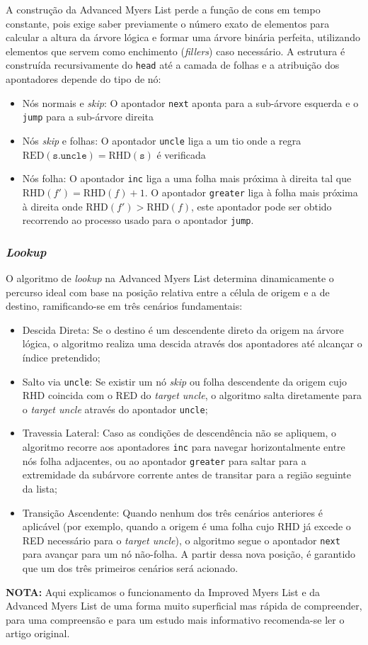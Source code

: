 A construção da Advanced Myers List perde a função de cons em tempo constante, pois exige saber previamente o número exato de elementos para calcular a altura da árvore lógica e formar uma árvore binária perfeita, utilizando elementos que servem como enchimento (\textit{fillers}) caso necessário.
A estrutura é construída recursivamente do \texttt{head} até a camada de folhas e a atribuição dos apontadores depende do tipo de nó:

\begin{itemize}
    \item Nós normais e \textit{skip}: O apontador \texttt{next} aponta para a sub-árvore esquerda e o \texttt{jump} para a sub-árvore direita
    \item Nós \textit{skip} e folhas: O apontador \texttt{uncle} liga a um tio onde a regra $\text{RED}(\texttt{s.uncle}) = \text{RHD}(\texttt{s})$ é verificada
    \item Nós folha: O apontador \texttt{inc} liga a uma folha mais próxima à direita tal que $\text{RHD}(f') = \text{RHD}(f) + 1$. O apontador \texttt{greater} liga à folha mais próxima à direita onde $\text{RHD}(f') > \text{RHD}(f)$, este apontador pode ser obtido recorrendo ao processo usado para o apontador \texttt{jump}.
\end{itemize}

\subsubsection{\textit{Lookup}}

O algoritmo de \textit{lookup} na Advanced Myers List determina dinamicamente o percurso ideal com base na posição relativa entre a célula de origem e a de destino, ramificando-se em três cenários fundamentais:

\begin{itemize}
    \item Descida Direta: Se o destino é um descendente direto da origem na árvore lógica, o algoritmo realiza uma descida através dos apontadores até alcançar o índice pretendido;
    \item Salto via \texttt{uncle}: Se existir um nó \textit{skip} ou folha descendente da origem cujo RHD coincida com o RED do \textit{target uncle}, o algoritmo salta diretamente para o \textit{target uncle} através do apontador \texttt{uncle};
    \item Travessia Lateral: Caso as condições de descendência não se apliquem, o algoritmo recorre aos apontadores \texttt{inc} para navegar horizontalmente entre nós folha adjacentes, ou ao apontador \texttt{greater} para saltar para a extremidade da subárvore corrente antes de transitar para a região seguinte da lista;
    \item Transição Ascendente: Quando nenhum dos três cenários anteriores é aplicável (por exemplo, quando a origem é uma folha cujo RHD já excede o RED necessário para o \textit{target uncle}), o algoritmo segue o apontador \texttt{next} para avançar para um nó não-folha. A partir dessa nova posição, é garantido que um dos três primeiros cenários será acionado.
\end{itemize}

\textbf{NOTA:} Aqui explicamos o funcionamento da Improved Myers List e da Advanced Myers List de uma forma muito superficial mas rápida de compreender, para uma compreensão e para um estudo mais informativo recomenda-se ler o artigo original.
